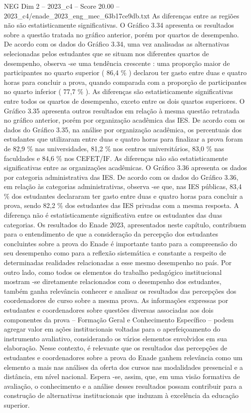 \begin{textsample}{NEG Dim 2 – 2023\_c4 – Score 20.00 – 2023\_c4/enade\_2023\_eng\_mec\_63b17ce9db.txt}
As diferenças entre as regiões não são estatisticamente significativas.
O Gráfico 3.34 apresenta os resultados sobre a questão tratada no gráfico anterior, porém por quartos de desempenho.
De acordo com os dados do Gráfico 3.34, uma vez analisadas as alternativas selecionadas pelos estudantes que se situam nos diferentes quartos de desempenho, observa -se uma tendência crescente : uma proporção maior de participantes no quarto superior ( 86,4 \% ) declarou ter gasto entre duas e quatro horas para concluir a prova, quando comparada com a proporção de participantes no quarto inferior ( 77,7 \% ).
As diferenças são estatisticamente significativas entre todos os quartos de desempenho, exceto entre os dois quartos superiores.
O Gráfico 3.35 apresenta outros resultados em relação à mesma questão retratada no gráfico anterior, porém por organização acadêmica das IES.
De acordo com os dados do Gráfico 3.35, na análise por organização acadêmica, os percentuais dos estudantes que utilizaram entre duas e quatro horas para finalizar a prova foram de 82,9 \% nas universidades, 81,2 \% nos centros universitários, 83,0 \% nas faculdades e 84,6 \% nos CEFET/IF.
As diferenças não são estatisticamente significativas entre as organizações acadêmicas.
O Gráfico 3.36 apresenta os dados por categoria administrativa das IES.
De acordo com os dados do Gráfico 3.36, em relação às categorias administrativas, observa -se que, nas IES públicas, 83,4 \% dos estudantes declararam ter gasto entre duas e quatro horas para concluir a prova, sendo 82,2 \% dos estudantes das IES privadas com a mesma resposta.
A diferença não é estatisticamente significativa entre os estudantes das duas categorias.
Os resultados do Enade 2023, apresentados neste capítulo, contribuem para o entendimento de que a consideração da percepção dos estudantes concluintes sobre a prova do Enade é importante tanto para a compreensão do seu desempenho como para a reflexão sistemática e constante a respeito de determinadas realidades relacionadas a esse mesmo desempenho no país.
Por outro lado, como todos os elementos do trabalho pedagógico institucional mostram -se diretamente relacionados com o desempenho dos estudantes, também ganha relevância conhecer e analisar os resultados das percepções dos coordenadores de curso sobre a mesma prova.
As informações expressas por estudantes e coordenadores sobre questões diversas associadas aos dois componentes da prova – Formação Geral e Conhecimento Específico – podem agregar valor em ações institucionais voltadas para o aperfeiçoamento do instrumento avaliativo, considerando os vários elementos envolvidos em sua elaboração.
Nesse contexto, é relevante que os resultados das percepções de estudantes e coordenadores sobre a prova do Enade ganhem relevância como um elemento a mais nas análises da oferta dos cursos nas modalidades presencial e a distância, em nível nacional.
Espera -se, assim, que, em uma visão formativa de avaliação, o conhecimento e a análise desses resultados possam contribuir para a construção de alternativas institucionais que induzam à excelência da educação superior.

\end{textsample}
